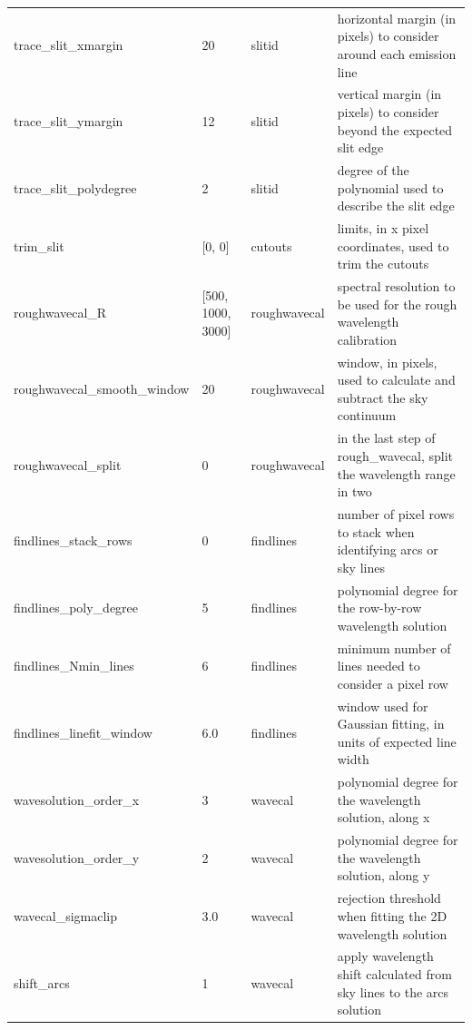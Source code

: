 \documentclass[a4paper]{article}
\begin{document}
\begin{sloppypar}
\begin{table}
{\begin{tabular}{llll}
    trace\_slit\_xmargin          & 20            & slitid           & horizontal margin (in pixels) to consider around each emission line \\
    trace\_slit\_ymargin          & 12            & slitid           & vertical margin (in pixels) to consider beyond the expected slit edge \\
    trace\_slit\_polydegree       & 2             & slitid           & degree of the polynomial used to describe the slit edge \\
    trim\_slit                    & [0, 0]        & cutouts          & limits, in x pixel coordinates, used to trim the cutouts \\
    roughwavecal\_R               & [500, 1000, 3000] & roughwavecal & spectral resolution to be used for the rough wavelength calibration \\
    roughwavecal\_smooth\_window  & 20            & roughwavecal     & window, in pixels, used to calculate and subtract the sky continuum \\
    roughwavecal\_split           & 0             & roughwavecal     & in the last step of rough\_wavecal, split the wavelength range in two \\
    findlines\_stack\_rows        & 0             & findlines        & number of pixel rows to stack when identifying arcs or sky lines \\
    findlines\_poly\_degree       & 5             & findlines        & polynomial degree for the row-by-row wavelength solution \\
    findlines\_Nmin\_lines        & 6             & findlines        & minimum number of lines needed to consider a pixel row \\
    findlines\_linefit\_window    & 6.0           & findlines        & window used for Gaussian fitting, in units of expected line width \\
    wavesolution\_order\_x        & 3             & wavecal          & polynomial degree for the wavelength solution, along x \\
    wavesolution\_order\_y        & 2             & wavecal          & polynomial degree for the wavelength solution, along y \\
    wavecal\_sigmaclip            & 3.0           & wavecal          & rejection threshold when fitting the 2D wavelength solution \\
    shift\_arcs                   & 1             & wavecal          & apply wavelength shift calculated from sky lines to the arcs solution \\

\end{tabular}}
\end{table}
\end{sloppypar}
\end{document}
